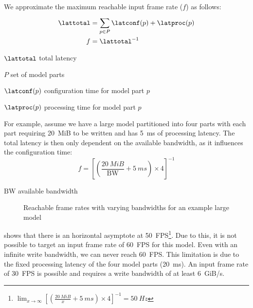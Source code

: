 We approximate the maximum reachable input frame rate ($f$) as follows:
\begin{align*} 
    \lattotal &= \sum_{p \in P}^{}{\latconf(p) + \latproc(p)} \\
    f &= \lattotal^{-1}
\end{align*}

\begin{eqexpl}[15mm]
    \item{$\lattotal$} total latency
    \item{$P$} set of model parts
    \item{$\latconf(p)$} configuration time for model part $p$
    \item{$\latproc(p)$} processing time for model part $p$
\end{eqexpl}

For example, assume we have a large model partitioned into four parts with each part requiring \SI{20}{MiB} to be written and has \SI{5}{ms} of processing latency.
The total latency is then only dependent on the available bandwidth, as it influences the configuration time:
\begin{equation*}
    f = \left[ \left( \frac{\SI{20}{MiB}}{\textrm{BW}} + \SI{5}{ms} \right) \times 4 \right]^{-1}
\end{equation*}

\begin{eqexpl}[15mm]
    \item{$\textrm{BW}$} available bandwidth
\end{eqexpl}

\begin{figure}
    \centering
    
    \caption{Reachable frame rates with varying bandwidths for an example large model}
    \label{fig:large_model_bandwidth_analysis_example}
\end{figure}

 shows that there is an horizontal asymptote at \SI{50}{FPS}\footnote{ $\lim_{x \to \infty} \left[ \left( \frac{\SI{20}{MiB}}{x} + \SI{5}{ms} \right) \times 4 \right]^{-1} = \SI{50}{Hz}$}.
Due to this, it is not possible to target an input frame rate of \SI{60}{FPS} for this model.
Even with an infinite write bandwidth, we can never reach \SI{60}{FPS}.
This limitation is due to the fixed processing latency of the four model parts (\SI{20}{ms}).
An input frame rate of \SI{30}{FPS} is possible and requires a write bandwidth of at least \SI{6}{GiB/s}.

